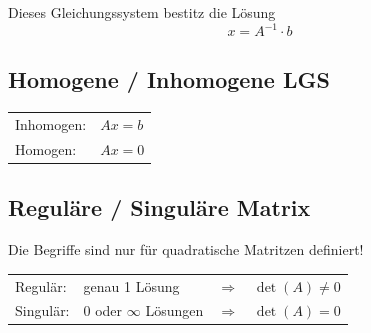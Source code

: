 Dieses Gleichungssystem bestitz die Lösung
$$x = A^{-1} \cdot b$$


\subsection{Homogene / Inhomogene LGS}
		
\begin{tabular}{ll}
	Inhomogen: 	& $Ax = b$ \\
	Homogen: 	& $Ax = 0$ 
\end{tabular}


\subsection{Reguläre / Singuläre Matrix}

Die Begriffe sind nur für quadratische Matritzen definiert! 
\vspace{0.2cm}

\begin{tabular}{lll}
	Regulär: 	& genau 1 Lösung 			& $\Rightarrow \quad \det(A) \neq 0$ \\
	Singulär: 	& 0 oder $\infty$ Lösungen 	& $\Rightarrow \quad \det(A) = 0$ 	\\
\end{tabular}
